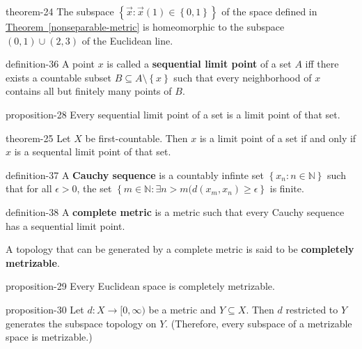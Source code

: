\documentclass[10pt,]{article}
\newcommand{\terminology}[1]{\textbf{#1}}
\newcommand{\mb}{\mathbb}
\newcommand{\setBuilder}[2]{\left\{#1:#2\right\}}
\newcommand{\setList}[1]{\left\{#1\right\}}
\newcommand{\gt}{>}
\begin{document}
\begin{theorem}{}{}{theorem-24}%
\hypertarget{p-125}{}%
The subspace \(\setBuilder{\vec x}{\vec{x}(1)\in\setList{0,1}}\) of the space defined in \hyperref[nonseparable-metric]{Theorem~\ref{nonseparable-metric}} is homeomorphic to the subspace \((0,1)\cup(2,3)\) of the Euclidean line.%
\end{theorem}
\begin{definition}{}{definition-36}%
\hypertarget{p-126}{}%
A point \(x\) is called a \terminology{sequential limit point} of a set \(A\) iff there exists a countable subset \(B\subseteq A\setminus\setList{x}\) such that every neighborhood of \(x\) contains all but finitely many points of \(B\).%
\end{definition}
\begin{proposition}{}{}{proposition-28}%
\hypertarget{p-127}{}%
Every sequential limit point of a set is a limit point of that set.%
\end{proposition}
\begin{theorem}{}{}{theorem-25}%
\hypertarget{p-128}{}%
Let \(X\) be first-countable. Then \(x\) is a limit point of a set if and only if \(x\) is a sequental limit point of that set.%
\end{theorem}
\begin{definition}{}{definition-37}%
\hypertarget{p-129}{}%
A \terminology{Cauchy sequence} is a countably infinte set \(\setBuilder{x_n}{n\in\mb N}\) such that for all \(\epsilon\gt0\), the set \(\setBuilder{m\in\mb N}{\exists n>m(d(x_m,x_n)\geq\epsilon}\) is finite.%
\end{definition}
\begin{definition}{}{definition-38}%
\hypertarget{p-130}{}%
A \terminology{complete metric} is a metric such that every Cauchy sequence has a sequential limit point.%
\par
\hypertarget{p-131}{}%
A topology that can be generated by a complete metric is said to be \terminology{completely metrizable}.%
\end{definition}
\begin{proposition}{}{}{proposition-29}%
\hypertarget{p-132}{}%
Every Euclidean space is completely metrizable.%
\end{proposition}
\begin{proposition}{}{}{proposition-30}%
\hypertarget{p-133}{}%
Let \(d:X\to[0,\infty)\) be a metric and \(Y\subseteq X\). Then \(d\) restricted to \(Y\) generates the subspace topology on \(Y\). (Therefore, every subspace of a metrizable space is metrizable.)%
\end{proposition}
\end{document}
